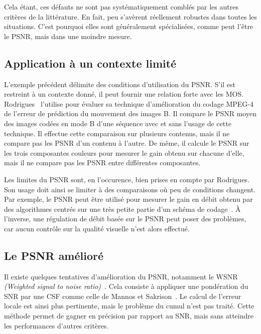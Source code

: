 Cela étant, ces défauts ne sont pas systématiquement comblés par les autres critères de la littérature. En fait, peu s'avèrent réellement robustes dans toutes les situations. C'est pourquoi elles sont généralement spécialisées, comme peut l'être le PSNR, mais dans une moindre mesure.


\subsection{Application à un contexte limité}
L'exemple précédent délimite des conditions d'utilisation du PSNR. S'il est restreint à un contexte donné, il peut fournir une relation forte avec les MOS.  Rodrigues~\cite{rodrigues-pcs2007} l'utilise pour évaluer sa technique d'amélioration du codage MPEG-4 de l'erreur de prédiction du mouvement des images B. Il compare le PSNR moyen des images codées en mode B d'une séquence avec et sans l'usage de cette technique. Il effectue cette comparaison sur plusieurs contenus, mais il ne compare pas les PSNR d'un contenu à l'autre. De même, il calcule le PSNR sur les trois composantes couleurs pour mesurer le gain obtenu sur chacune d'elle, mais il ne compare pas les PSNR entre différentes composantes.

Les limites du PSNR sont, en l'occurence, bien prises en compte par Rodrigues. Son usage doit ainsi se limiter à des comparaisons où peu de conditions changent. Par exemple, le PSNR peut être utilisé pour mesurer le gain en débit obtenu par des algorithmes centrés sur une très petite partie d'un schéma de codage~\cite{merkle-eusipco2007}. À l'inverse, une régulation de débit basée sur le PSNR peut poser des problèmes, car aucun contrôle sur la qualité visuelle n'est alors effectué.


\subsection{Le PSNR amélioré}
Il existe quelques tentatives d'amélioration du PSNR, notamment le WSNR \emph{(Weighted signal to noise ratio)}~\cite{damera-ieee2000}. Cela consiste à appliquer une pondération du SNR par une CSF comme celle de Mannos et Sakrison~\cite{mannos-ieee1974}. Le calcul de l'erreur locale est ainsi plus pertinente, mais le problème du cumul n'est pas traité. Cette méthode permet de gagner en précision par rapport au SNR, mais sans atteindre les performances d'autres critères.


